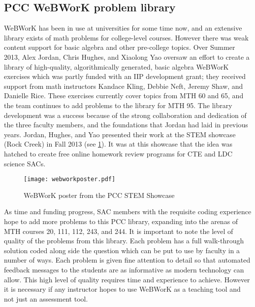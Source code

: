 \subsection{PCC WeBWorK problem library}
WeBWorK has been in use at universities for some time now, and an extensive
library exists of math problems for college-level courses. However there was
weak content support for basic algebra and other pre-college topics. Over
Summer 2013, Alex Jordan, Chris Hughes, and Xiaolong Yao oversaw an effort to
create
a library of high-quality, algorithmically generated, basic algebra WeBWorK
exercises which was partly funded with an IIP development grant; they received
support from math instructors Kandace Kling, Debbie Neft, Jeremy Shaw, and Danielle Rice.  These
exercises currently cover topics from MTH 60 and 65, and the team continues to
add problems to the library for MTH 95. The library development was a success
because of the strong collaboration and dedication of the three faculty members,
and the foundations that Jordan had laid in previous years. Jordan, Hughes,
and Yao presented their work at the STEM showcase (Rock Creek) in Fall 2013 (see
\cref{webworkposter}). It was at this showcase that the idea was hatched to
create free online homework review programs for CTE and LDC science SACs.

\begin{figure}[!htb]
	\centering
	\texttt{[image: webworkposter.pdf]}
	\caption{WeBWorK poster from the PCC STEM Showcase}\label{webworkposter}
\end{figure}

As time and funding progress, SAC members with the requisite coding experience
hope to add more problems to this PCC library, expanding into the arenas of MTH
courses 20, 111, 112, 243, and 244. It is important to note the level of quality
of the problems from this library. Each problem has a full walk-through solution
coded along side the question which can be put to use by faculty in a number of
ways. Each problem is given fine attention to detail so that automated feedback
messages to the students are as informative as modern technology can allow. This
high level of quality requires time and experience to achieve. However it is
necessary if any instructor hopes to use WeBWorK as a teaching tool and not just
an assessment tool.

